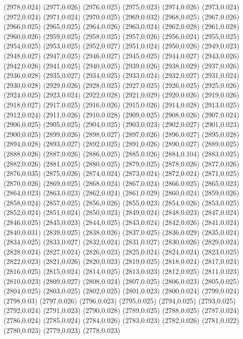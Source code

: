(2978,0.024)
(2977,0.026)
(2976,0.025)
(2975,0.023)
(2974,0.026)
(2973,0.024)
(2972,0.024)
(2971,0.024)
(2970,0.025)
(2969,0.032)
(2968,0.025)
(2967,0.026)
(2966,0.025)
(2965,0.025)
(2964,0.026)
(2963,0.024)
(2962,0.028)
(2961,0.028)
(2960,0.026)
(2959,0.025)
(2958,0.025)
(2957,0.026)
(2956,0.024)
(2955,0.025)
(2954,0.025)
(2953,0.025)
(2952,0.027)
(2951,0.024)
(2950,0.026)
(2949,0.023)
(2948,0.027)
(2947,0.025)
(2946,0.027)
(2945,0.025)
(2944,0.027)
(2943,0.026)
(2942,0.026)
(2941,0.025)
(2940,0.025)
(2939,0.026)
(2938,0.029)
(2937,0.026)
(2936,0.028)
(2935,0.027)
(2934,0.025)
(2933,0.024)
(2932,0.027)
(2931,0.024)
(2930,0.028)
(2929,0.026)
(2928,0.025)
(2927,0.025)
(2926,0.025)
(2925,0.026)
(2924,0.025)
(2923,0.024)
(2922,0.028)
(2921,0.029)
(2920,0.026)
(2919,0.026)
(2918,0.027)
(2917,0.025)
(2916,0.026)
(2915,0.026)
(2914,0.028)
(2913,0.025)
(2912,0.024)
(2911,0.026)
(2910,0.028)
(2909,0.025)
(2908,0.026)
(2907,0.024)
(2906,0.025)
(2905,0.025)
(2904,0.025)
(2903,0.023)
(2902,0.027)
(2901,0.023)
(2900,0.025)
(2899,0.026)
(2898,0.027)
(2897,0.026)
(2896,0.027)
(2895,0.028)
(2894,0.028)
(2893,0.027)
(2892,0.025)
(2891,0.026)
(2890,0.027)
(2889,0.025)
(2888,0.026)
(2887,0.026)
(2886,0.025)
(2885,0.026)
(2884,0.104)
(2883,0.025)
(2882,0.026)
(2881,0.025)
(2880,0.025)
(2879,0.025)
(2878,0.026)
(2877,0.026)
(2876,0.035)
(2875,0.026)
(2874,0.024)
(2873,0.024)
(2872,0.024)
(2871,0.025)
(2870,0.026)
(2869,0.025)
(2868,0.024)
(2867,0.024)
(2866,0.025)
(2865,0.023)
(2864,0.023)
(2863,0.023)
(2862,0.024)
(2861,0.029)
(2860,0.024)
(2859,0.026)
(2858,0.024)
(2857,0.025)
(2856,0.026)
(2855,0.023)
(2854,0.026)
(2853,0.025)
(2852,0.024)
(2851,0.024)
(2850,0.023)
(2849,0.024)
(2848,0.023)
(2847,0.024)
(2846,0.025)
(2845,0.023)
(2844,0.025)
(2843,0.024)
(2842,0.026)
(2841,0.024)
(2840,0.031)
(2839,0.025)
(2838,0.026)
(2837,0.025)
(2836,0.029)
(2835,0.024)
(2834,0.025)
(2833,0.027)
(2832,0.024)
(2831,0.027)
(2830,0.026)
(2829,0.024)
(2828,0.024)
(2827,0.024)
(2826,0.023)
(2825,0.024)
(2824,0.024)
(2823,0.025)
(2822,0.023)
(2821,0.026)
(2820,0.023)
(2819,0.025)
(2818,0.024)
(2817,0.024)
(2816,0.025)
(2815,0.024)
(2814,0.025)
(2813,0.023)
(2812,0.025)
(2811,0.023)
(2810,0.023)
(2809,0.027)
(2808,0.024)
(2807,0.025)
(2806,0.023)
(2805,0.025)
(2804,0.025)
(2803,0.025)
(2802,0.025)
(2801,0.023)
(2800,0.024)
(2799,0.024)
(2798,0.03)
(2797,0.026)
(2796,0.023)
(2795,0.025)
(2794,0.025)
(2793,0.025)
(2792,0.024)
(2791,0.023)
(2790,0.028)
(2789,0.025)
(2788,0.025)
(2787,0.024)
(2786,0.024)
(2785,0.024)
(2784,0.026)
(2783,0.023)
(2782,0.026)
(2781,0.022)
(2780,0.023)
(2779,0.023)
(2778,0.023)
